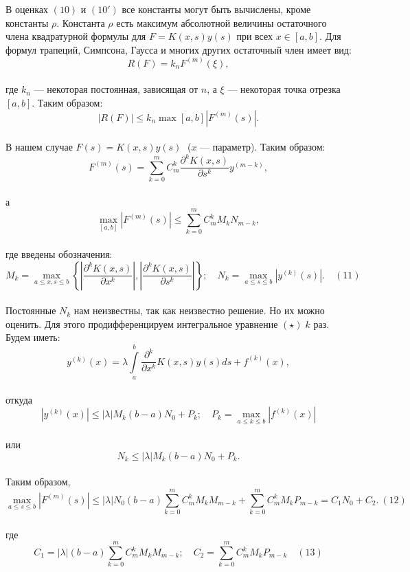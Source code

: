 \documentclass[12pt]{article}
\begin{document}
В оценках $ (10) $ и $ (10') $ все константы могут быть вычислены, кроме константы $ \rho $. Константа $ \rho $ есть максимум абсолютной величины остаточного члена квадратурной формулы для $ F = K(x,s) y(s) $ при всех $ x\in [a,b] $. Для формул трапеций, Симпсона, Гаусса и многих других остаточный член имеет вид:\\
$$ R(F) = k_{n}F^{(m)}(\xi) ,$$\\
где $ k_{n} $ — некоторая постоянная, зависящая от $ n $, а $ \xi $ — некоторая точка отрезка $ [a,b] $. Таким образом:\\
$$ |R(F)| \leqslant k_{n}\max\limits{[a,b]}|F^{(m)}(s)| . $$\\
В нашем случае $ F(s) = K(x,s)y(s) \; $ ($ x $ — параметр). Таким образом:\\
$$ F^{(m)}(s) = \sum\limits_{k=0}^m C_m^k \frac{\partial^{k}K(x,s)}{\partial s^{k}} y^{(m-k)} , $$ \\
а\\
$$ \max\limits_{[a,b]} |F^{(m)}(s)| \leqslant \sum\limits_{k=0}^m C_m^k M_k N_{m-k} , $$\\
где введены обозначения:\\
$$ M_k = \max\limits_{a \leqslant x,s \leqslant b } \left\lbrace \left| \frac{\partial^{k}K(x,s)}{\partial x^{k}} \right|, \left| \frac{\partial^{k}K(x,s)}{\partial s^{k}} \right|  \right\rbrace ; \quad N_k = \max\limits_{a \leqslant s \leqslant b} |y^{(k)}(s)|. \quad (11)   $$ \\
Постоянные $ N_k $ нам неизвестны, так как неизвестно решение. Но их можно оценить. Для этого продифференцируем интегральное уравнение $ (\star) \; k $ раз. Будем иметь: \\
$$ y^{(k)}(x) = \lambda \int\limits_a^b \frac{\partial^{k}}{\partial x^{k}} K(x,s)y(s)ds + f^{(k)}(x) , $$\\
откуда\\
$$ |y^{(k)}(x)| \leqslant |\lambda| M_{k}(b-a)N_0 + P_k; \quad P_k = \max\limits_{a\leqslant k \leqslant b} |f^{(k)}(x)| $$\\
или\\
$$ N_k \leqslant |\lambda|M_k (b-a)N_0 + P_k . $$\\
Таким образом,\\
$$ \max\limits_{a \leqslant s \leqslant b}|F^{(m)}(s)| \leqslant |\lambda| N_0(b-a)\sum\limits_{k=0}^m C_m^k M_k M_{m-k} + \sum\limits_{k=0}^m C_m^k M_k P_{m-k} = C_1 N_0 + C_2 . \: (12) $$\\
где\\
$$ C_1 = |\lambda|(b-a)\sum\limits_{k=0}^m C_m^k M_k M_{m-k}; \quad C_2 = \sum\limits_{k=0}^m C_m^k M_k P_{m-k} \quad (13) $$\\
\end{document}
